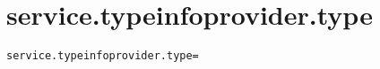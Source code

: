 \section{service.typeinfoprovider.type}
\label{configuration:ServiceTypeinfoproviderType}
\AvailableInJavaOnly{\TODO}
\begin{lstlisting}[style=Props,caption={Usage example for \textit{service.typeinfoprovider.type}}]
service.typeinfoprovider.type=
\end{lstlisting}